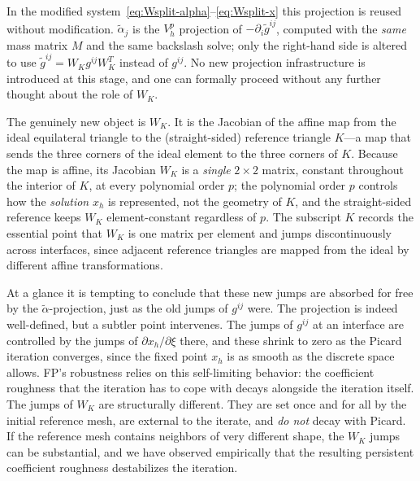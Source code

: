 \documentclass[11pt]{article}
\begin{document}
In the modified system~\eqref{eq:Wsplit-alpha}--\eqref{eq:Wsplit-x}
this projection is reused without modification. $\tilde\alpha_j$ is
the $V_h^p$ projection of $-\partial_i \tilde g^{ij}$, computed with
the \emph{same} mass matrix $M$ and the same backslash solve; only
the right-hand side is altered to use
$\tilde g^{ij} = W_K g^{ij} W_K^T$ instead of $g^{ij}$. No new
projection infrastructure is introduced at this stage, and one can
formally proceed without any further thought about the role of
$W_K$.

The genuinely new object is $W_K$. It is the Jacobian of the affine
map from the ideal equilateral triangle to the (straight-sided)
reference triangle $K$---a map that sends the three corners of the
ideal element to the three corners of $K$. Because the map is
affine, its Jacobian $W_K$ is a \emph{single} $2 \times 2$ matrix,
constant throughout the interior of $K$, at every polynomial order
$p$; the polynomial order $p$ controls how the \emph{solution} $x_h$
is represented, not the geometry of $K$, and the straight-sided
reference keeps $W_K$ element-constant regardless of $p$. The
subscript $K$ records the essential point that $W_K$ is one matrix
per element and jumps discontinuously across interfaces, since
adjacent reference triangles are mapped from the ideal by different
affine transformations.

At a glance it is tempting to conclude that these new jumps are
absorbed for free by the $\tilde\alpha$-projection, just as the old
jumps of $g^{ij}$ were. The projection is indeed well-defined, but
a subtler point intervenes. The jumps of $g^{ij}$ at an interface
are controlled by the jumps of $\partial x_h / \partial \xi$ there,
and these shrink to zero as the Picard iteration converges, since
the fixed point $x_h$ is as smooth as the discrete space allows.
FP's robustness relies on this self-limiting behavior: the
coefficient roughness that the iteration has to cope with decays
alongside the iteration itself. The jumps of $W_K$ are structurally
different. They are set once and for all by the initial reference
mesh, are external to the iterate, and \emph{do not} decay with
Picard. If the reference mesh contains neighbors of very different
shape, the $W_K$ jumps can be substantial, and we have observed
empirically that the resulting persistent coefficient roughness
destabilizes the iteration.
\end{document}
